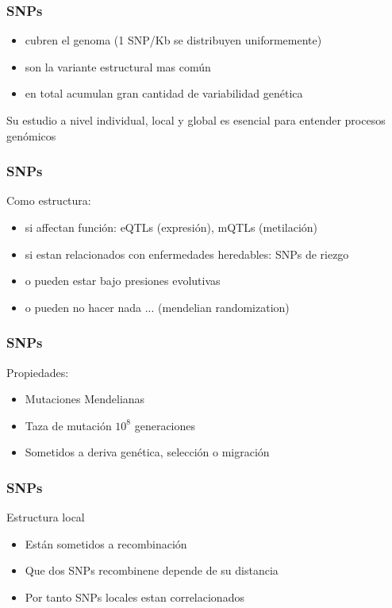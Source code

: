 \documentclass{beamer}\usepackage[]{graphicx}\usepackage[]{color}
\begin{document}
\begin{frame}[fragile] 
\frametitle{SNPs}

\begin{itemize}
  \item cubren el genoma (1 SNP/Kb se distribuyen uniformemente)
  \item son la variante estructural mas com\'un 
 \item en total acumulan gran cantidad de variabilidad gen\'etica 
\end{itemize}

Su estudio a nivel individual, local y global es esencial para entender procesos genómicos
\end{frame}

\begin{frame}[fragile] 
\frametitle{SNPs}

Como estructura: 

\begin{itemize}
  \item si affectan funci\'on: eQTLs (expresi\'on), mQTLs (metilaci\'on)
  \item si estan relacionados con enfermedades heredables: SNPs de riezgo 
  \item o pueden estar bajo presiones evolutivas  
  \item o pueden no hacer nada ... (mendelian randomization)
\end{itemize}

\end{frame}


\begin{frame}[fragile] 
\frametitle{SNPs}
Propiedades:

\begin{itemize}
  \item Mutaciones Mendelianas
  \item Taza de mutaci\'on $10^8$ generaciones
  \item Sometidos a deriva gen\'etica, selecci\'on o migraci\'on 
\end{itemize}

\end{frame}


\begin{frame}[fragile] 
\frametitle{SNPs}
Estructura local

\begin{itemize}
  \item Est\'an sometidos a recombinación
  \item Que dos SNPs recombinene depende de su distancia
  \item Por tanto SNPs locales estan correlacionados
\end{itemize}

\end{frame}
\end{document}
